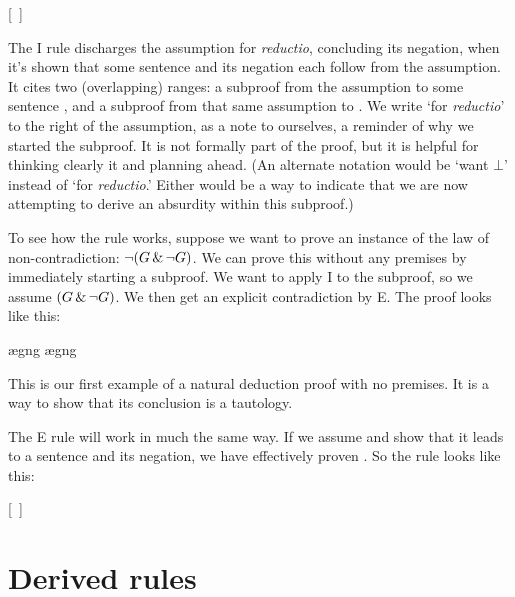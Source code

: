 \begin{ndproof}
\open
	\metaA{}
	\metaB{}
\close
{}[\ ]{\enot\metaA{}}
\end{ndproof}

The {\enot}I rule discharges the assumption for \emph{reductio}, concluding its negation, when it's shown that some sentence and its negation each follow from the assumption. It cites two (overlapping) ranges: a subproof from the assumption to some sentence \metaB{}, and a subproof from that same assumption to \enot\metaB{}. We write `for \emph{reductio}' to the right of the assumption, as a note to ourselves, a reminder of why we started the subproof. It is not formally part of the proof, but it is helpful for thinking clearly it and planning ahead. (An alternate notation would be `want $\bot$' instead of `for \emph{reductio}.' Either would be a way to indicate that we are now attempting to derive an absurdity within this subproof.)

To see how the rule works, suppose we want to prove an instance of the law of non-contradiction: $\neg(G \,\&\, \neg G)$. We can prove this without any premises by immediately starting a subproof. We want to apply {\enot}I to the subproof, so we assume $(G \,\&\, \neg G)$. We then get an explicit contradiction by {\eand}E. The proof looks like this:

\begin{ndproof}
	\open
		\ae{gng}
		\ae{gng}
	\close
\end{ndproof}

This is our first example of a natural deduction proof with no premises. It is a way to show that its conclusion is a tautology.

The {\enot}E rule will work in much the same way. If we assume \enot\metaA{} and show that it leads to a sentence and its negation, we have effectively proven \metaA{}. So the rule looks like this:

\begin{ndproof}
\open
	\metaB{}
\close
{}[\ ]\metaA{}
\end{ndproof}
\section{Derived rules}

